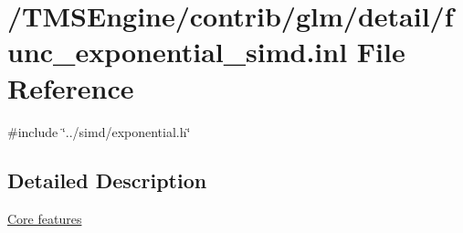 \hypertarget{func__exponential__simd_8inl}{}\section{/\+T\+M\+S\+Engine/contrib/glm/detail/func\+\_\+exponential\+\_\+simd.inl File Reference}
\label{func__exponential__simd_8inl}
{\ttfamily \#include \char`\"{}../simd/exponential.\+h\char`\"{}}\newline


\subsection{Detailed Description}
\hyperlink{group__core}{Core features} 